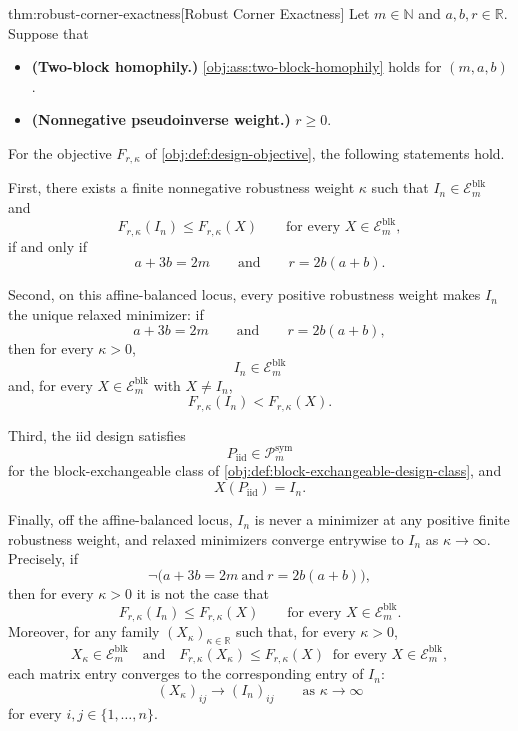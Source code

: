 \begin{theoremv}{thm:robust-corner-exactness}[Robust Corner Exactness]
Let \(m\in\mathbb N\) and \(a,b,r\in\mathbb R\). Suppose that
\begin{itemize}
\item \textbf{(Two-block homophily.)} \cref{obj:ass:two-block-homophily} holds for \((m,a,b)\).
\item \textbf{(Nonnegative pseudoinverse weight.)} \(r\ge 0\).
\end{itemize}
For the objective \(F_{r,\kappa}\) of \cref{obj:def:design-objective}, the following statements hold.

First, there exists a finite nonnegative robustness weight \(\kappa\) such that \(I_n\in\mathcal E_m^{\mathrm{blk}}\) and
\[
F_{r,\kappa}(I_n)\le F_{r,\kappa}(X)
\qquad\text{for every }X\in\mathcal E_m^{\mathrm{blk}},
\]
if and only if
\[
a+3b=2m
\qquad\text{and}\qquad
r=2b(a+b).
\]

Second, on this affine-balanced locus, every positive robustness weight makes \(I_n\) the unique relaxed minimizer: if
\[
a+3b=2m
\qquad\text{and}\qquad
r=2b(a+b),
\]
then for every \(\kappa>0\),
\[
I_n\in\mathcal E_m^{\mathrm{blk}}
\]
and, for every \(X\in\mathcal E_m^{\mathrm{blk}}\) with \(X\ne I_n\),
\[
F_{r,\kappa}(I_n)<F_{r,\kappa}(X).
\]

Third, the iid design satisfies
\[
P_{\mathrm{iid}}\in\mathcal P_m^{\mathrm{sym}}
\]
for the block-exchangeable class of \cref{obj:def:block-exchangeable-design-class}, and
\[
X(P_{\mathrm{iid}})=I_n.
\]

Finally, off the affine-balanced locus, \(I_n\) is never a minimizer at any positive finite robustness weight, and relaxed minimizers converge entrywise to \(I_n\) as \(\kappa\to\infty\). Precisely, if
\[
\neg\bigl(a+3b=2m\ \text{and}\ r=2b(a+b)\bigr),
\]
then for every \(\kappa>0\) it is not the case that
\[
F_{r,\kappa}(I_n)\le F_{r,\kappa}(X)
\qquad\text{for every }X\in\mathcal E_m^{\mathrm{blk}}.
\]
Moreover, for any family \((X_\kappa)_{\kappa\in\mathbb R}\) such that, for every \(\kappa>0\),
\[
X_\kappa\in\mathcal E_m^{\mathrm{blk}}
\quad\text{and}\quad
F_{r,\kappa}(X_\kappa)\le F_{r,\kappa}(X)
\ \text{ for every }X\in\mathcal E_m^{\mathrm{blk}},
\]
each matrix entry converges to the corresponding entry of \(I_n\):
\[
(X_\kappa)_{ij}\longrightarrow (I_n)_{ij}
\qquad\text{as }\kappa\to\infty
\]
for every \(i,j\in\{1,\ldots,n\}\).
\end{theoremv}

